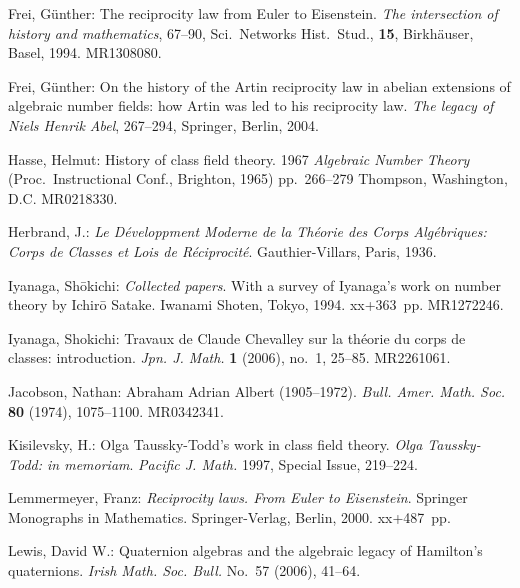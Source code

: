 \noindent Frei, G\"unther: The reciprocity law from Euler to Eisenstein. \emph{The intersection of history and mathematics}, 67--90, Sci.~Networks Hist.~Stud., \textbf{15}, Birkh\"auser, Basel, 1994. MR1308080.\par\medskip

\noindent Frei, G\"unther: On the history of the Artin reciprocity law in abelian extensions of algebraic number fields: how Artin was led to his reciprocity law. \emph{The legacy of Niels Henrik Abel}, 267--294, Springer, Berlin, 2004.\par\medskip

\noindent Hasse, Helmut: History of class field theory. 1967 \emph{Algebraic Number Theory} (Proc.~Instructional Conf., Brighton, 1965) pp.~266--279 Thompson, Washington, D.C. MR0218330.\par\medskip

\noindent Herbrand, J.: \emph{Le D\'eveloppment Moderne de la Th\'eorie des Corps Alg\'ebriques: Corps de Classes et Lois de R\'eciprocit\'e}. Gauthier-Villars, Paris, 1936.\par\medskip

\noindent Iyanaga, Sh\=okichi: \emph{Collected papers}. With a survey of Iyanaga's work on number theory by Ichir\=o Satake. Iwanami Shoten, Tokyo, 1994. xx+363~pp. MR1272246.\par\medskip

\noindent Iyanaga, Shokichi: Travaux de Claude Chevalley sur la th\'eorie du corps de classes: introduction. \emph{Jpn. J. Math.} \textbf{1} (2006), no.~1, 25--85. MR2261061.\par\medskip

\noindent Jacobson, Nathan: Abraham Adrian Albert (1905--1972). \emph{Bull. Amer. Math. Soc.} \textbf{80} (1974), 1075--1100. MR0342341.\par\medskip

\noindent Kisilevsky, H.: Olga Taussky-Todd's work in class field theory. \emph{Olga Taussky-Todd: in memoriam}. \emph{Pacific J. Math.} 1997, Special Issue, 219--224.\par\medskip

\noindent Lemmermeyer, Franz: \emph{Reciprocity laws. From Euler to Eisenstein}. Springer Monographs in Mathematics. Springer-Verlag, Berlin, 2000. xx+487~pp.\par\medskip

\noindent Lewis, David W.: Quaternion algebras and the algebraic legacy of Hamilton's quaternions. \emph{Irish Math. Soc. Bull.} No.~57 (2006), 41--64.\par\medskip

